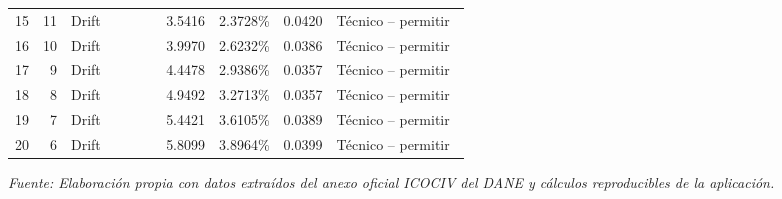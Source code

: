 \begin{landscape}
\begin{table}[H]
\begin{adjustbox}{max width=\linewidth}
\begin{tabular}{rrp{0.22\linewidth}rrrp{0.31\linewidth}}
15 & 11 & Drift & 3.5416 & 2.3728\% & 0.0420 & Técnico -- permitir \\
16 & 10 & Drift & 3.9970 & 2.6232\% & 0.0386 & Técnico -- permitir \\
17 & 9 & Drift & 4.4478 & 2.9386\% & 0.0357 & Técnico -- permitir \\
18 & 8 & Drift & 4.9492 & 3.2713\% & 0.0357 & Técnico -- permitir \\
19 & 7 & Drift & 5.4421 & 3.6105\% & 0.0389 & Técnico -- permitir \\
20 & 6 & Drift & 5.8099 & 3.8964\% & 0.0399 & Técnico -- permitir \\
\bottomrule
\end{tabular}
\end{adjustbox}
\par\footnotesize\textit{Fuente: Elaboración propia con datos extraídos del anexo oficial ICOCIV del DANE y cálculos reproducibles de la aplicación.}
\end{table}
\end{landscape}
